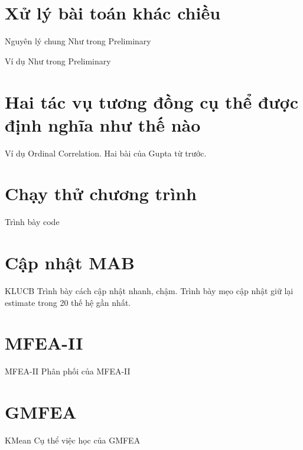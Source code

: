 
\section{Xử lý bài toán khác chiều}
    \begin{frame}{Nguyên lý chung}
        Như trong Preliminary
    \end{frame}
    \begin{frame}{Ví dụ}
        Như trong Preliminary
    \end{frame}

\section{Hai tác vụ tương đồng cụ thể được định nghĩa như thế nào}
    \begin{frame}{Ví dụ}
        Ordinal Correlation.
        Hai bài của Gupta từ trước.
    \end{frame}

\section{Chạy thử chương trình}
    \begin{frame}{Trình bày code}
    \end{frame}



\section{Cập nhật MAB}
    \begin{frame}{KLUCB}
        Trình bày cách cập nhật nhanh, chậm.
        Trình bày mẹo cập nhật giữ lại estimate trong 20 thế hệ gần nhất.
    \end{frame}

\section{MFEA-II}
    \begin{frame}{MFEA-II}
        Phân phối của MFEA-II
    \end{frame}

\section{GMFEA}
    \begin{frame}{KMean}
        Cụ thể việc học của GMFEA
    \end{frame}

